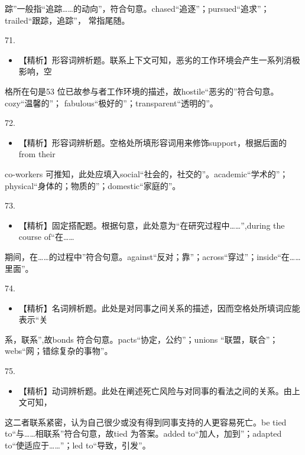 \documentclass[UTF8,11pt]{ctexart}
\begin{document}
踪”一般指“追踪……的动向”，符合句意。chased“追逐”；pursued“追求”；trailed“跟踪，追踪”， 常指尾随。


71.


\begin{itemize}[leftmargin=2em,itemsep=.2em,topsep=.4em]\item[C.] 【精析】形容词辨析题。联系上下文可知，恶劣的工作环境会产生一系列消极影响，空
\end{itemize}

格所在句是53 位已故参与者工作环境的描述，故hostile“恶劣的”符合句意。cozy“温馨的”； fabulous“极好的”；transparent“透明的”。


72.


\begin{itemize}[leftmargin=2em,itemsep=.2em,topsep=.4em]\item[A.] 【精析】形容词辨析题。空格处所填形容词用来修饰support，根据后面的from their
\end{itemize}

co-workers 可推知，此处应填入social“社会的，社交的”。academic“学术的”；physical“身体的；物质的”；domestic“家庭的”。


73.


\begin{itemize}[leftmargin=2em,itemsep=.2em,topsep=.4em]\item[D.] 【精析】固定搭配题。根据句意，此处意为“在研究过程中……”,during the course of“在……
\end{itemize}

期间，在……的过程中”符合句意。against“反对；靠”；across“穿过”；inside“在……里面”。


74.


\begin{itemize}[leftmargin=2em,itemsep=.2em,topsep=.4em]\item[B.] 【精析】名词辨析题。此处是对同事之间关系的描述，因而空格处所填词应能表示“关
\end{itemize}

系，联系”,故bonds 符合句意。pacts“协定，公约”；unions “联盟，联合”；webs“网；错综复杂的事物”。


75.


\begin{itemize}[leftmargin=2em,itemsep=.2em,topsep=.4em]\item[C.] 【精析】动词辨析题。此处在阐述死亡风险与对同事的看法之间的关系。由上文可知，
\end{itemize}

这二者联系紧密，认为自己很少或没有得到同事支持的人更容易死亡。be tied to“与……相联系”符合句意，故tied 为答案。added to“加人，加到”；adapted to“使适应于……”；led to“导致，引发”。
\end{document}
